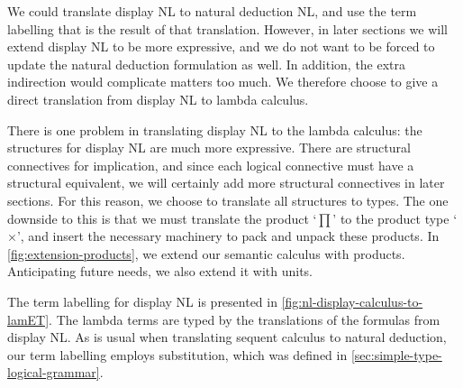 We could translate display NL to natural deduction NL, and use the
term labelling that is the result of that translation. However, in
later sections we will extend display NL to be more expressive, and we
do not want to be forced to update the natural deduction formulation
as well. In addition, the extra indirection would complicate matters
too much. We therefore choose to give a direct translation from
display NL to lambda calculus.



There is one problem in translating display NL to the lambda
calculus: the structures for display NL are much more expressive. There
are structural connectives for implication, and since each logical
connective must have a structural equivalent, we will certainly add
more structural connectives in later sections. For this reason, we
choose to translate all structures to types. The one downside to this
is that we must translate the product `$\prod$' to the product type
`$\times$', and insert the necessary machinery to pack and unpack
these products.
In \autoref{fig:extension-products}, we extend our semantic calculus
with products. Anticipating future needs, we also extend it with
units.

The term labelling for display NL is presented in
\autoref{fig:nl-display-calculus-to-lamET}. The lambda terms are typed
by the translations of the formulas from display NL. As is usual when
translating sequent calculus to natural deduction, our term labelling
employs substitution, which was defined in
\autoref{sec:simple-type-logical-grammar}.



